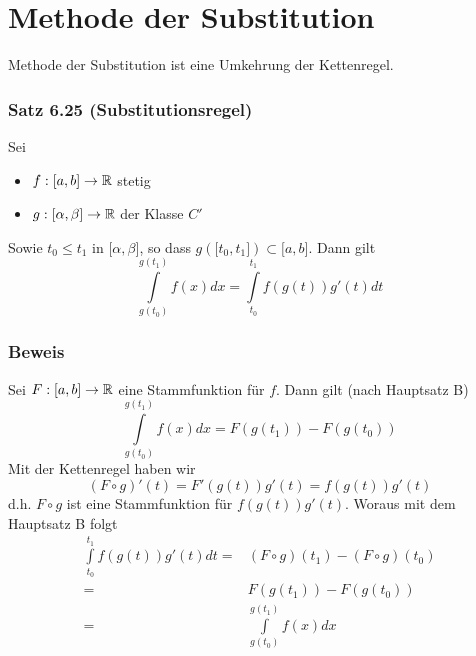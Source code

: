 \section{Methode der Substitution}
Methode der Substitution ist eine Umkehrung der Kettenregel.
\subsubsection*{Satz 6.25 (Substitutionsregel)}
Sei
\begin{itemize}
\item $f:\lbrack a,b\rbrack\to\mathbb{R}$ stetig
\item $g:\lbrack\alpha,\beta\rbrack\to\mathbb{R}$ der Klasse $C'$
\end{itemize}
Sowie $t_0\leq t_1$ in $\lbrack\alpha,\beta\rbrack$, so dass $g\left(\lbrack t_0, t_1\rbrack\right)\subset\lbrack a,b\rbrack$.
Dann gilt
\[\int\limits_{g({t_0})}^{g({t_1})} {f(x)dx = \int\limits_{{t_0}}^{{t_1}} {f\left( {g\left( t \right)} \right)g'\left( t \right)dt} } \]

\subsubsection*{Beweis}
Sei $F:\lbrack a,b\rbrack\to\mathbb{R}$ eine Stammfunktion für $f$. Dann gilt (nach Hauptsatz B)
\[\int\limits_{g({t_0})}^{g({t_1})} {f(x)dx = F\left( {g({t_1})} \right)}  - F\left( {g({t_0})} \right)\]
Mit der Kettenregel haben wir
\[(F \circ g)'(t) = F'(g(t))g'(t) = f(g(t))g'(t)\]
d.h. $F\circ g$ ist eine Stammfunktion für $f(g(t))g'(t)$. Woraus mit dem Hauptsatz B folgt
\begin{align*}
\int\limits_{{t_0}}^{{t_1}} {f\left( {g(t)} \right)} g'(t)dt =&\left( {F \circ g} \right)({t_1}) - \left( {F \circ g} \right)({t_0})\\
 =&F\left( {g({t_1})} \right) - F\left( {g({t_0})} \right)\\
 =&\int\limits_{g({t_0})}^{g({t_1})} {f(x)dx}
\end{align*}

